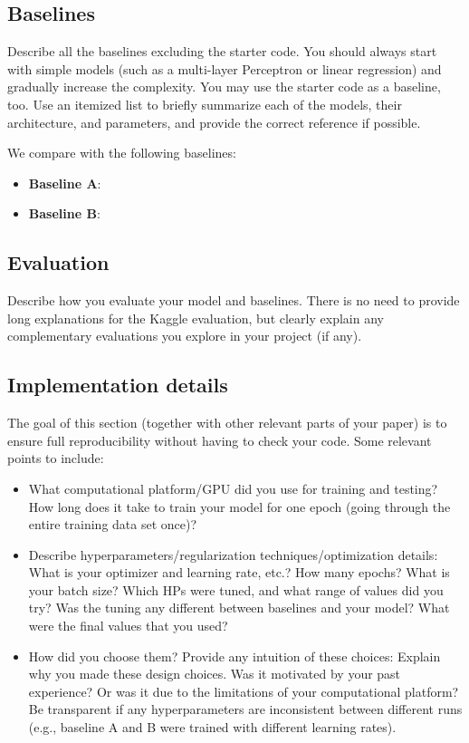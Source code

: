 \documentclass{article}
\begin{document}
\subsection{Baselines}
\label{sec:baselines}
Describe all the baselines excluding the starter code. You should always start with simple models (such as a multi-layer Perceptron or linear regression) and gradually increase the complexity. You may use the starter code as a baseline, too.
Use an itemized list to briefly summarize each of the models, their architecture, and parameters, and provide the correct reference if possible.

We compare with the following baselines:
\begin{itemize}
    \item \textbf{Baseline A}:
    \item \textbf{Baseline B}: 
\end{itemize}
% 
\subsection{Evaluation}
\label{sec:evaluation}
Describe how you evaluate your model and baselines. There is no need to provide long explanations for the Kaggle evaluation, but clearly explain any complementary evaluations you explore in your project (if any).
% 
\subsection{Implementation details}
\label{sec:implementation_details}
The goal of this section (together with other relevant parts of your paper) is to ensure full reproducibility without having to check your code.
Some relevant points to include:
\begin{itemize}
    \item What computational platform/GPU did you use for training and testing? How long does it take to train your model for one epoch (going through the entire training data set once)?
    \item Describe hyperparameters/regularization techniques/optimization details: What is your optimizer and learning rate, etc.? How many epochs? What is your batch size? Which HPs were tuned, and what range of values did you try? Was the tuning any different between baselines and your model? What were the final values that you used?
    \item  How did you choose them? Provide any intuition of these choices: Explain why you made these design choices. Was it motivated by your past experience? Or was it due to the limitations of your computational platform? Be transparent if any hyperparameters are inconsistent between different runs (e.g., baseline A and B were trained with different learning rates). 
\end{itemize}
% 
\end{document}
